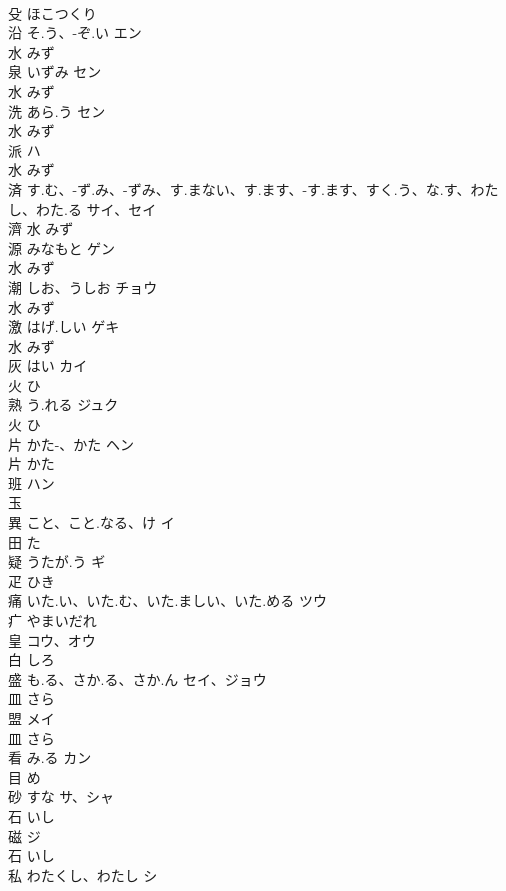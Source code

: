 \documentclass[8pt]{extreport}
\begin{document}
\begin{CJK}{UTF8}{min}
\\	殳		ほこつくり		
\\	沿	そ.う、-ぞ.い	エン	
\\	水		みず		
\\	泉	いずみ	セン	
\\	水		みず		
\\	洗	あら.う	セン	
\\	水		みず		
\\	派		ハ	
\\	水		みず		
\\	済	す.む、-ず.み、-ずみ、す.まない、す.ます、-す.ます、すく.う、な.す、わたし、わた.る	サイ、セイ	
\\	濟	水		みず		
\\	源	みなもと	ゲン	
\\	水		みず		
\\	潮	しお、うしお	チョウ	
\\	水		みず		
\\	激	はげ.しい	ゲキ	
\\	水		みず		
\\	灰	はい	カイ	
\\	火		ひ		
\\	熟	う.れる	ジュク	
\\	火		ひ		
\\	片	かた-、かた	ヘン	
\\	片		かた		
\\	班		ハン	
\\	玉				
\\	異	こと、こと.なる、け	イ	
\\	田		た		
\\	疑	うたが.う	ギ	
\\	疋		ひき		
\\	痛	いた.い、いた.む、いた.ましい、いた.める	ツウ	
\\	疒		やまいだれ		
\\	皇		コウ、オウ	
\\	白		しろ		
\\	盛	も.る、さか.る、さか.ん	セイ、ジョウ	
\\	皿		さら		
\\	盟		メイ	
\\	皿		さら		
\\	看	み.る	カン	
\\	目		め		
\\	砂	すな	サ、シャ	
\\	石		いし		
\\	磁		ジ	
\\	石		いし		
\\	私	わたくし、わたし	シ	

\end{CJK}
\end{document}
